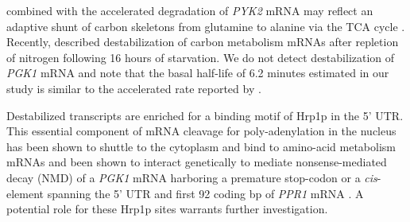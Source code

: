 combined with the accelerated degradation of \textit{PYK2} mRNA 
may reflect an adaptive shunt of carbon skeletons from glutamine 
to alanine via the TCA cycle \parencite{boles1998identification}. 
Recently, \cite{tesniere2017relief}
described destabilization  of carbon metabolism mRNAs after repletion
of nitrogen following 16 hours of starvation. We do
not detect destabilization of \textit{PGK1} mRNA and note that
the basal half-life of 6.2 minutes estimated in our study is similar
to the accelerated rate reported by \cite{tesniere2017relief}.


Destabilized
transcripts are enriched for a binding motif of Hrp1p in
the 5’ UTR. This essential component of mRNA cleavage for
poly-adenylation in the nucleus has been shown to shuttle to the
cytoplasm and bind to amino-acid metabolism mRNAs
\parencite{guisbert2005functional} and been shown to interact genetically to
mediate nonsense-mediated decay (NMD) of a \textit{PGK1} mRNA harboring a
premature stop-codon \parencite{gonzalez2000yeast} or a \textit{cis}-element spanning
the 5’ UTR and first 92 coding bp of \textit{PPR1} mRNA
\parencite{kebaara2003upf}.
A potential role for these Hrp1p sites warrants further investigation. 

